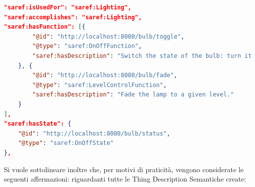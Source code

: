\documentclass[12pt,a4paper,openright,oneside]{report}
\begin{document}
\begin{lstlisting}[language=json,caption={Aggiunta di semantica per la lampadina},label=lst:semantic-td2]
"saref:isUsedFor": "saref:Lighting",
"saref:accomplishes": "saref:Lighting",
"saref:hasFunction": [{	
		"@id": "http://localhost:8080/bulb/toggle",
		"@type": "saref:OnOffFunction",
		"saref:hasDescription": "Switch the state of the bulb: turn it off if on or turn it on when off."
	}, {
		"@id": "http://localhost:8080/bulb/fade",
		"@type": "saref:LevelControlFunction",
		"saref:hasDescription": "Fade the lamp to a given level."
	}
],
"saref:hasState": {
	"@id": "http://localhost:8080/bulb/status",
	"@type": "saref:OnOffState"
},
\end{lstlisting}

Si vuole sottolineare inoltre che, per motivi di praticità, vengono considerate le seguenti affermazioni: riguardanti tutte le Thing Description Semantiche create:
\end{document}
